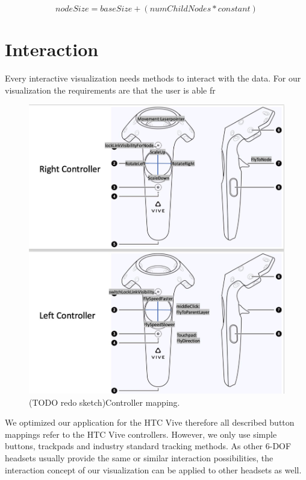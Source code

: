 \begin{equation}
    nodeSize = baseSize + (numChildNodes * constant)
\end{equation}

\section{Interaction}
\label{chap:solution-interaction}

Every interactive visualization needs methods to interact with the data. 
For our visualization the requirements are that the user is able fr 

\begin{figure}[h]
    \centering
    \includegraphics[width=1\textwidth]{chapters/graphics/controllerMapping.jpg}
    \caption{(TODO redo sketch)Controller mapping.} 
    \label{fig:controllerMapping} 
\end{figure}

We optimized our application for the HTC Vive therefore all described button mappings refer to the HTC Vive controllers. However, we only use simple buttons, trackpads and industry standard tracking methods. 
As other 6-DOF headsets usually provide the same or similar interaction possibilities, the interaction concept of our visualization can be applied to other headsets as well.\\

